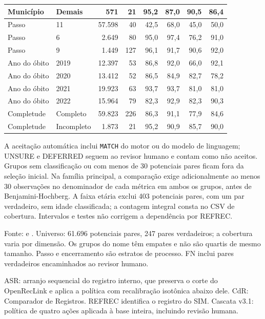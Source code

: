 \begin{table}[htbp]
{\begin{tabular}{llrrrrrr}
Munic\'ipio & Demais & 571 & 21 & 95{,}2 & 87{,}0 & 90{,}5 & 86{,}4 \\
\midrule
Passo & 11 & 57.598 & 40 & 42{,}5 & 68{,}0 & 45{,}0 & 50{,}0 \\
Passo & 6 & 2.649 & 80 & 95{,}0 & 97{,}4 & 76{,}2 & 91{,}0 \\
Passo & 9 & 1.449 & 127 & 96{,}1 & 91{,}7 & 90{,}6 & 92{,}0 \\
\midrule
Ano do \'obito & 2019 & 12.397 & 53 & 86{,}8 & 92{,}0 & 66{,}0 & 92{,}1 \\
Ano do \'obito & 2020 & 13.412 & 52 & 86{,}5 & 84{,}9 & 82{,}7 & 78{,}2 \\
Ano do \'obito & 2021 & 19.923 & 63 & 93{,}7 & 93{,}7 & 81{,}0 & 81{,}0 \\
Ano do \'obito & 2022 & 15.964 & 79 & 82{,}3 & 92{,}9 & 82{,}3 & 90{,}3 \\
\midrule
Completude & Completo & 59.823 & 226 & 86{,}3 & 91{,}1 & 77{,}9 & 84{,}6 \\
Completude & Incompleto & 1.873 & 21 & 95{,}2 & 90{,}9 & 85{,}7 & 90{,}0 \\
\bottomrule
\end{tabular}}
\par\smallskip\begin{minipage}{\linewidth}\footnotesize A aceitação automática inclui \texttt{MATCH} do motor ou do modelo de linguagem; UNSURE e DEFERRED seguem ao revisor humano e contam como não aceitos. Grupos sem classificação ou com menos de 30 potenciais pares ficam fora da seleção inicial. Na família principal, a comparação exige adicionalmente ao menos 30 observações no denominador de cada métrica em ambos os grupos, antes de Benjamini-Hochberg. A faixa etária exclui 403 potenciais pares, com um par verdadeiro, sem idade classificada; a contagem integral consta no CSV de cobertura. Intervalos e testes não corrigem a dependência por REFREC.\end{minipage}\par\footnotesize Fonte:  e . Universo: 61.696 potenciais pares, 247 pares verdadeiros; a cobertura varia por dimensão. Os grupos do nome têm empates e não são quartis de mesmo tamanho. Passo e encerramento são estratos de processo. FN inclui pares verdadeiros encaminhados ao revisor humano.
\par\footnotesize ASR: arranjo sequencial do registro interno, que preserva o corte do OpenRecLink e aplica a política com recalibração isotônica abaixo dele. CdR: Comparador de Registros. REFREC identifica o registro do SIM. Cascata v3.1: política de quatro ações aplicada à base inteira, incluindo revisão humana.
\end{table}

